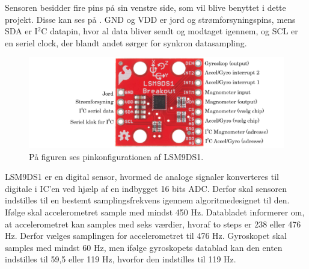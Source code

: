 Sensoren besidder fire pins på sin venstre side, som vil blive benyttet i dette projekt. Disse kan ses på . GND og VDD er jord og strømforsyningspins, mens SDA er I$^2$C datapin, hvor al data bliver sendt og modtaget igennem, og SCL er en seriel clock, der blandt andet sørger for synkron datasampling.
\begin{figure}[H]
	\centering
	\includegraphics[scale=0.3]{figures/cDesign/accelerometeret.png}
	\caption{På figuren ses pinkonfigurationen af LSM9DS1. \citep{Jimb02016}}
	\label{fig:IC_pins}
\end{figure}
LSM9DS1 er en digital sensor, hvormed de analoge signaler konverteres til digitale i IC'en ved hjælp af en indbygget 16 bits ADC. Derfor skal sensoren indstilles til en bestemt samplingsfrekvens igennem algoritmedesignet til den. Ifølge  skal accelerometret sample med mindst 450 Hz. Databladet informerer om, at accelerometret kan samples med seks værdier, hvoraf to steps er 238 eller 476 Hz. Derfor vælges samplingen for accelerometret til 476 Hz. Gyroskopet skal samples med mindst 60 Hz, men ifølge gyroskopets datablad kan den enten indstilles til 59,5 eller 119 Hz, hvorfor den indstilles til 119 Hz.

